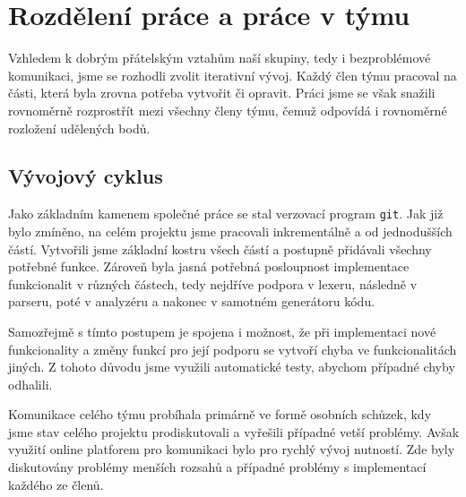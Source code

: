 \section{Rozdělení práce a práce v týmu}
Vzhledem k dobrým přátelským vztahům naší skupiny, tedy i bezproblémové
komunikaci, jsme se rozhodli zvolit iterativní vývoj. Každý člen týmu pracoval
na části, která byla zrovna potřeba vytvořit či opravit. Práci jsme se však
snažili rovnoměrně rozprostřít mezi všechny členy týmu, čemuž odpovídá i
rovnoměrné rozložení udělených bodů.

\subsection{Vývojový cyklus}
Jako základním kamenem společné práce se stal verzovací program \texttt{git}.
Jak již bylo zmíněno, na celém projektu jsme pracovali inkrementálně a od
jednodušších částí. Vytvořili jsme základní kostru všech částí a postupně
přidávali všechny potřebné funkce. Zároveň byla jasná potřebná posloupnost
implementace funkcionalit v různých částech, tedy nejdříve podpora v lexeru,
následně v parseru, poté v analyzéru a nakonec v samotném generátoru kódu.

Samozřejmě s tímto postupem je spojena i možnost, že při implementaci nové
funkcionality a změny funkcí pro její podporu se vytvoří chyba ve
funkcionalitách jiných. Z tohoto důvodu jsme využili automatické testy, abychom
případné chyby odhalili.

Komunikace celého týmu probíhala primárně ve formě osobních schůzek, kdy jsme
stav celého projektu prodiskutovali a vyřešili případné vetší problémy. Avšak
využití online platforem pro komunikaci bylo pro rychlý vývoj nutností. Zde
byly diskutovány problémy menších rozsahů a případné problémy s implementací
každého ze členů.
